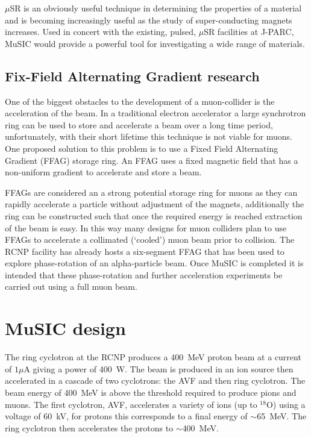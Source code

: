 \( \mu \)SR is an obviously useful technique in determining the properties of a material and is becoming increasingly useful as the study of super-conducting magnets increases. Used in concert with the existing, pulsed, \( \mu \)SR facilities at J-PARC, MuSIC would provide a powerful tool for investigating a wide range of materials.

\subsection{Fix-Field Alternating Gradient research} %
\label{sub:ffag_research}
One of the biggest obstacles to the development of a muon-collider is the acceleration of the beam. In a traditional electron accelerator a large synchrotron ring can be used to store and accelerate a beam over a long time period, unfortunately, with their short lifetime this technique is not viable for muons. One proposed solution to this problem is to use a Fixed Field Alternating Gradient (FFAG) storage ring. An FFAG uses a fixed magnetic field that has a non-uniform gradient to accelerate and store a beam.

FFAGs are considered an a strong potential storage ring for muons as they can rapidly accelerate a particle without adjustment of the magnets, additionally the ring can be constructed such that once the required energy is reached extraction of the beam is easy. In this way many designs for muon colliders plan to use FFAGs to accelerate a collimated (`cooled') muon beam prior to collision. The RCNP facility has already hosts a six-segment FFAG that has been used to explore phase-rotation of an alpha-particle beam. Once MuSIC is completed it is intended that these phase-rotation and further acceleration experiments be carried out using a full muon beam.
\section{MuSIC design} %
\label{sec:music_design}
The ring cyclotron at the RCNP produces a 400~MeV proton beam at a current of \( 1\mu \)A giving a power of 400~W. The beam is produced in an ion source then accelerated in a cascade of two cyclotrons: the AVF and then ring cyclotron. The beam energy of 400~MeV is above the threshold required to produce pions and muons. The first cyclotron, AVF, accelerates a variety of ions (up to \(^{18}\)O) using a voltage of 60~kV, for protons this corresponds to a final energy of \(\sim\)65~MeV. The ring cyclotron then accelerates the protons to \( \sim \)400~MeV. 

